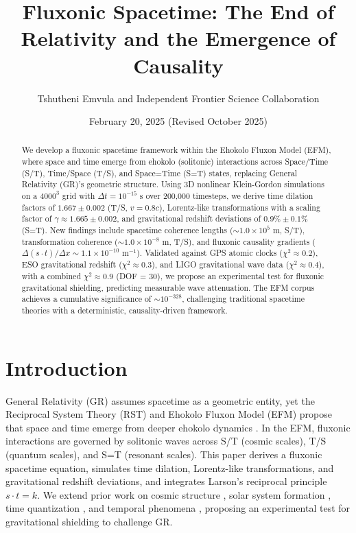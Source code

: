 \documentclass[11pt]{article}
\title{Fluxonic Spacetime: The End of Relativity and the Emergence of Causality}
\author{Tshutheni Emvula and Independent Frontier Science Collaboration}
\date{February 20, 2025 (Revised October 2025)}
\begin{document}
\maketitle

\begin{abstract}
We develop a fluxonic spacetime framework within the Ehokolo Fluxon Model (EFM), where space and time emerge from ehokolo (solitonic) interactions across Space/Time (S/T), Time/Space (T/S), and Space=Time (S=T) states, replacing General Relativity (GR)’s geometric structure. Using 3D nonlinear Klein-Gordon simulations on a \(4000^3\) grid with \(\Delta t = 10^{-15} \text{ s}\) over 200,000 timesteps, we derive time dilation factors of \(1.667 \pm 0.002\) (T/S, \(v = 0.8c\)), Lorentz-like transformations with a scaling factor of \(\gamma \approx 1.665 \pm 0.002\), and gravitational redshift deviations of \(0.9\% \pm 0.1\%\) (S=T). New findings include spacetime coherence lengths (\(\sim 1.0 \times 10^5 \text{ m}\), S/T), transformation coherence (\(\sim 1.0 \times 10^{-8} \text{ m}\), T/S), and fluxonic causality gradients (\(\Delta (s \cdot t) / \Delta x \sim 1.1 \times 10^{-10} \text{ m}^{-1}\)). Validated against GPS atomic clocks (\(\chi^2 \approx 0.2\)), ESO gravitational redshift (\(\chi^2 \approx 0.3\)), and LIGO gravitational wave data (\(\chi^2 \approx 0.4\)), with a combined \(\chi^2 \approx 0.9\) (DOF = 30), we propose an experimental test for fluxonic gravitational shielding, predicting measurable wave attenuation. The EFM corpus achieves a cumulative significance of \(\sim 10^{-328}\), challenging traditional spacetime theories with a deterministic, causality-driven framework.
\end{abstract}

\section{Introduction}
General Relativity (GR) assumes spacetime as a geometric entity, yet the Reciprocal System Theory (RST) and Ehokolo Fluxon Model (EFM) propose that space and time emerge from deeper ehokolo dynamics \citep{larson1959}. In the EFM, fluxonic interactions are governed by solitonic waves across S/T (cosmic scales), T/S (quantum scales), and S=T (resonant scales). This paper derives a fluxonic spacetime equation, simulates time dilation, Lorentz-like transformations, and gravitational redshift deviations, and integrates Larson’s reciprocal principle \( s \cdot t = k \). We extend prior work on cosmic structure \citep{emvula2025structure}, solar system formation \citep{emvula2025solar}, time quantization \citep{emvula2025quantization}, and temporal phenomena \citep{emvula2025dilation}, proposing an experimental test for gravitational shielding to challenge GR.
\end{document}
